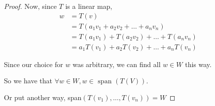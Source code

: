 \documentclass[12pt,letterpaper]{article}
\begin{document}
\begin{enumerate}
\begin{proof}
        Now, since $T$ is a linear map,
        \begin{align*}
          w &= T(v) \\
          &= T(a_1v_1 + a_2v_2 + \dots + a_nv_n) \\
          &= T(a_1v_1) + T(a_2v_2) + \dots + T(a_nv_n) \\
          &= a_1T(v_1) + a_2T(v_2) + \dots + a_nT(v_n)
        \end{align*}

        Since our choice for $w$ was arbitrary, we can find all $w \in W$ this way.

        So we have that $\forall w \in W, w \in \text{ span }(T(V))$.

        Or put another way, span$(T(v_1), \dots, T(v_n)) = W$
      \end{proof}
  \end{enumerate}
\end{document}
